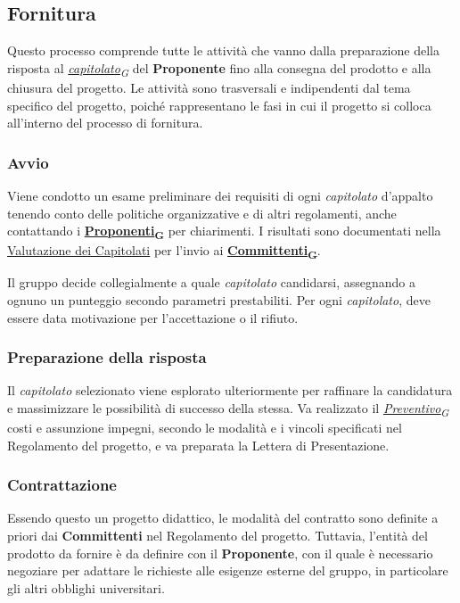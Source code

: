 \documentclass[12pt, a4paper]{article}
\newcommand{\urlglossario}{https://skynetunigroup.github.io/Code_Guardian/Documentazione/PB/glossario_v2.0.0.pdf} %
\newcommand{\glo}[2]{\href{\urlglossario\#nameddest=#2}{#1\textsubscript{G}}}
\begin{document}
\subsection{Fornitura}
Questo processo comprende tutte le attività che vanno dalla preparazione della risposta al \textit{\glo{capitolato}{capitolato}} del \textbf{Proponente} fino alla consegna del prodotto e alla chiusura del progetto. Le attività sono trasversali e indipendenti dal tema specifico del progetto, poiché rappresentano le fasi in cui il progetto si colloca all'interno del processo di fornitura.

\subsubsection{Avvio}
Viene condotto un esame preliminare dei requisiti di ogni \textit{capitolato} d'appalto tenendo conto delle politiche organizzative e di altri regolamenti, anche contattando i \textbf{\glo{Proponenti}{proponente}} per chiarimenti. I risultati sono documentati nella \href{https://github.com/SkynetUniGroup/Code_Guardian/blob/main/Documentazione/Candidatura/valutazione_capitolati_v1.0.pdf}{Valutazione dei Capitolati} per l'invio ai \textbf{\glo{Committenti}{committente}}. 

Il gruppo decide collegialmente a quale \textit{capitolato} candidarsi, assegnando a ognuno un punteggio secondo parametri prestabiliti. Per ogni \textit{capitolato}, deve essere data motivazione per l'accettazione o il rifiuto.

\subsubsection{Preparazione della risposta}
Il \textit{capitolato} selezionato viene esplorato ulteriormente per raffinare la candidatura e massimizzare le possibilità di successo della stessa. Va realizzato il \textit{\glo{Preventivo}{preventivo}} costi e assunzione impegni, secondo le modalità e i vincoli specificati nel Regolamento del progetto, e va preparata la Lettera di Presentazione.

\subsubsection{Contrattazione}
Essendo questo un progetto didattico, le modalità del contratto sono definite a priori dai \textbf{Committenti} nel Regolamento del progetto. Tuttavia, l'entità del prodotto da fornire è da definire con il \textbf{Proponente}, con il quale è necessario negoziare per adattare le richieste alle esigenze esterne del gruppo, in particolare gli altri obblighi universitari.
\end{document}
